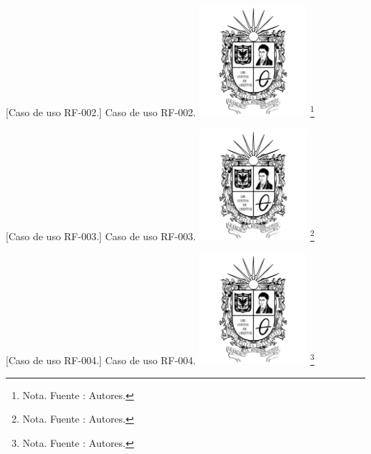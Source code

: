 \begin{itemize}
{    \vspace{2mm}
    \begin{minipage}{0.9\textwidth}
    \centering
    [{Caso de uso RF-002.}]{ Caso de uso RF-002. }
    \label{caso2}
    \includegraphics[width=0.3\textwidth]{Content/Images/Escudo_UD.png}
    \footnote{Nota. \textup{Fuente : Autores.}}
    \end{minipage}
    
    \vspace{2mm}
    \begin{minipage}{0.9\textwidth}
    \centering
    [{Caso de uso RF-003.}]{ Caso de uso RF-003. }
    \label{caso3}
    \includegraphics[width=0.3\textwidth]{Content/Images/Escudo_UD.png}
    \footnote{Nota. \textup{Fuente : Autores.}}
    \end{minipage}
    
    \vspace{2mm}
    \begin{minipage}{0.9\textwidth}
    \centering
    [{Caso de uso RF-004.}]{ Caso de uso RF-004. }
    \label{caso4}
    \includegraphics[width=0.3\textwidth]{Content/Images/Escudo_UD.png}
    \footnote{Nota. \textup{Fuente : Autores.}}
    \end{minipage}
    
}
\end{itemize}
